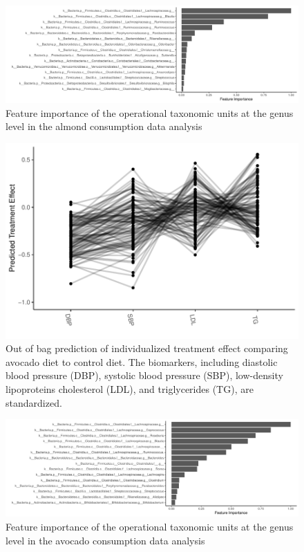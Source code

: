 \documentclass[smallextended]{svjour3}
\begin{document}
\begin{figure}[h]
    \centering
    \includegraphics[width = \textwidth]{Fig3_AlmondFI.pdf}
    \caption{Feature importance of the operational taxonomic units at the genus level in the almond consumption data analysis}\label{AlmondFI}
\end{figure}

\begin{figure}[h]
    \centering
    \includegraphics[width = \textwidth]{Fig4_AvocadoTreatmentEffect.pdf}
    \caption{ Out of bag prediction of individualized treatment effect comparing avocado diet to control diet. The biomarkers, including diastolic blood pressure (DBP), systolic blood pressure (SBP), low-density lipoproteins cholesterol (LDL), and triglycerides (TG), are standardized.}\label{AvocadoPlot}
\end{figure}


\begin{figure}[h]
    \centering
    \includegraphics[width = \textwidth]{Fig5_AvocadoFI.pdf}
    \caption{Feature importance of the operational taxonomic units at the genus level in the avocado consumption data analysis}\label{AvocadoFI}
\end{figure}

\clearpage



\end{document}
